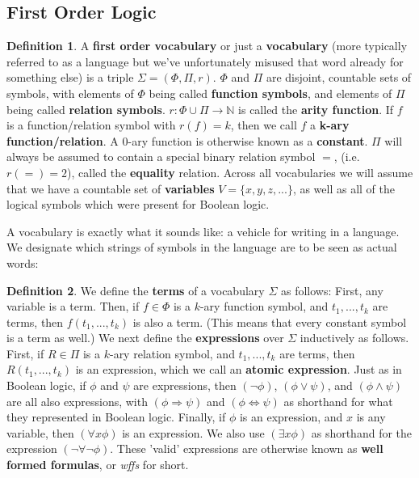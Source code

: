 \documentclass{article}
\theoremstyle{definition}
\newtheorem{definition}{Definition}[section]
\theoremstyle{plain}
\theoremstyle{theorem}
\begin{document}
\subsection{First Order Logic}
\begin{definition}
    A \textbf{first order vocabulary} or just a \textbf{vocabulary} (more typically referred to as a language but we've unfortunately misused that word already for something else) is a triple $\Sigma = (\Phi,\Pi,r)$. $\Phi$ and $\Pi$ are disjoint, countable sets of symbols, with elements of $\Phi$ being called \textbf{function symbols}, and elements of $\Pi$ being called \textbf{relation symbols}. $r: \Phi \cup \Pi \to \mathbb{N}$ is called the \textbf{arity function}. If $f$ is a function/relation symbol with $r(f)=k$, then we call $f$ a \textbf{k-ary function/relation}. A $0$-ary function is otherwise known as a \textbf{constant}. $\Pi$ will always be assumed to contain a special binary relation symbol $=$, (i.e. $r(=)=2$), called the \textbf{equality} relation. Across all vocabularies we will assume that we have a countable set of \textbf{variables} $V = \{x,y,z,...\}$, as well as all of the logical symbols which were present for Boolean logic. 
\end{definition} 
A vocabulary is exactly what it sounds like: a vehicle for writing in a language. We designate which strings of symbols in the language are to be seen as actual words: 
\begin{definition}
    We define the \textbf{terms} of a vocabulary $\Sigma$ as follows: First, any variable is a term. Then, if $f \in \Phi$ is a $k$-ary function symbol, and $t_1,...,t_k$ are terms, then $f(t_1,...,t_k)$ is also a term. (This means that every constant symbol is a term as well.) We next define the \textbf{expressions} over $\Sigma$ inductively as follows. First, if $R \in \Pi$ is a $k$-ary relation symbol, and $t_1,...,t_k$ are terms, then $R(t_1,...,t_k)$ is an expression, which we call an \textbf{atomic expression}. Just as in Boolean logic, if $\phi$ and $\psi$ are expressions, then $(\neg \phi)$, $(\phi \vee \psi)$, and $(\phi \wedge \psi)$ are all also expressions, with $(\phi \Rightarrow \psi)$ and $(\phi \iff \psi)$ as shorthand for what they represented in Boolean logic. Finally, if $\phi$ is an expression, and $x$ is any variable, then $(\forall x \phi)$ is an expression. We also use $(\exists x \phi)$ as shorthand for the expression $(\neg \forall \neg \phi)$. These 'valid' expressions are otherwise known as \textbf{well formed formulas}, or \textit{wffs} for short.
\end{definition}
\end{document}
